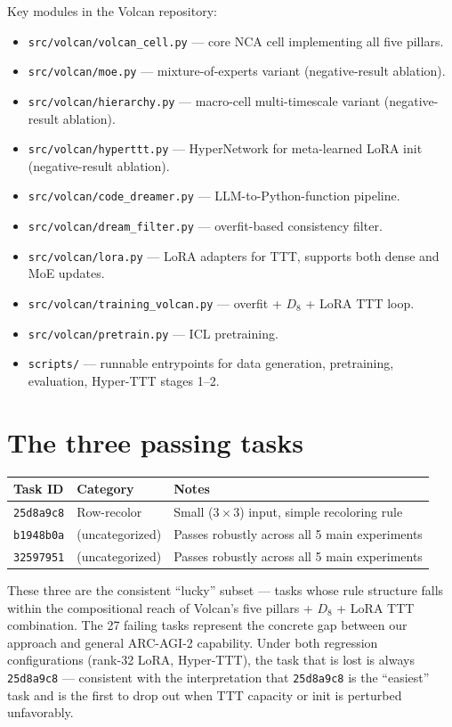 \documentclass[11pt]{article}
\begin{document}
Key modules in the Volcan repository:
\begin{itemize}
    \item \verb|src/volcan/volcan_cell.py| --- core NCA cell implementing all five pillars.
    \item \verb|src/volcan/moe.py| --- mixture-of-experts variant (negative-result ablation).
    \item \verb|src/volcan/hierarchy.py| --- macro-cell multi-timescale variant (negative-result ablation).
    \item \verb|src/volcan/hyperttt.py| --- HyperNetwork for meta-learned LoRA init (negative-result ablation).
    \item \verb|src/volcan/code_dreamer.py| --- LLM-to-Python-function pipeline.
    \item \verb|src/volcan/dream_filter.py| --- overfit-based consistency filter.
    \item \verb|src/volcan/lora.py| --- LoRA adapters for TTT, supports both dense and MoE updates.
    \item \verb|src/volcan/training_volcan.py| --- overfit + $D_8$ + LoRA TTT loop.
    \item \verb|src/volcan/pretrain.py| --- ICL pretraining.
    \item \verb|scripts/| --- runnable entrypoints for data generation, pretraining, evaluation, Hyper-TTT stages 1--2.
\end{itemize}

\section{The three passing tasks}

\begin{center}
\begin{tabular}{llp{7cm}}
\toprule
Task ID & Category & Notes \\
\midrule
\texttt{25d8a9c8} & Row-recolor & Small ($3 \times 3$) input, simple recoloring rule \\
\texttt{b1948b0a} & (uncategorized) & Passes robustly across all 5 main experiments \\
\texttt{32597951} & (uncategorized) & Passes robustly across all 5 main experiments \\
\bottomrule
\end{tabular}
\end{center}

These three are the consistent ``lucky'' subset --- tasks whose rule structure falls within the compositional reach of Volcan's five pillars + $D_8$ + LoRA TTT combination. The 27 failing tasks represent the concrete gap between our approach and general ARC-AGI-2 capability. Under both regression configurations (rank-32 LoRA, Hyper-TTT), the task that is lost is always \texttt{25d8a9c8} --- consistent with the interpretation that \texttt{25d8a9c8} is the ``easiest'' task and is the first to drop out when TTT capacity or init is perturbed unfavorably.
\end{document}
